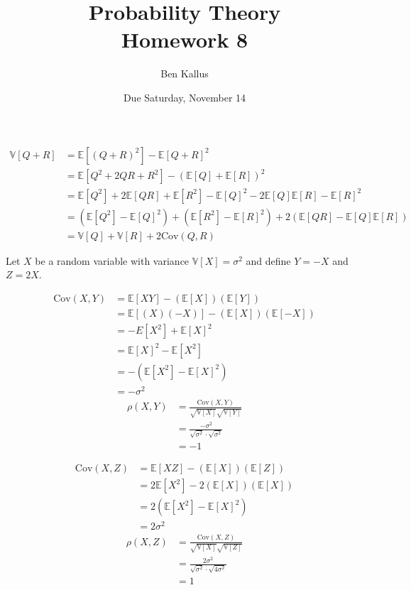 \documentclass[12pt]{article}
\title{Probability Theory \\ Homework 8}
\author{Ben Kallus}
\date{Due Saturday, November 14}
\begin{document}
\pagecolor{black}
\color{white}
\maketitle

\begin{align*}
    \mathbb V[Q + R] &= \mathbb E[(Q + R)^2] - \mathbb E[Q + R]^2 \\
                     &= \mathbb E[Q^2 + 2QR + R^2] - (\mathbb E[Q] + \mathbb E[R])^2 \\
                     &= \mathbb E[Q^2] + 2\mathbb E[QR] + \mathbb E[R^2] - \mathbb E[Q]^2 - 2\mathbb E[Q]\mathbb E[R] - \mathbb E[R]^2 \\
                     &= (\mathbb E[Q^2] - \mathbb E[Q]^2) + (\mathbb E[R^2] - \mathbb E[R]^2) + 2(\mathbb E[QR] - \mathbb E[Q]\mathbb E[R]) \\
                     &= \mathbb V[Q] + \mathbb V[R] + 2\text{Cov}(Q,R)
\end{align*}

\newpage
{} Let $X$ be a random variable with variance $\mathbb V[X] = \sigma^2$ and define $Y = -X$ and $Z = 2X$.

\medskip
{}
\begin{align*}
    \text{Cov}(X,Y) &= \mathbb E[XY] -(\mathbb E[X])(\mathbb E[Y]) \\
                    &= \mathbb E[(X)(-X)] -(\mathbb E[X])(\mathbb E[-X]) \\
                    &= \mathbb -E[X^2] +\mathbb E[X]^2 \\
                    &= \mathbb E[X]^2 - \mathbb E[X^2] \\
                    &= -(\mathbb E[X^2] - \mathbb E[X]^2) \\
                    &= -\sigma^2
\end{align*}
\begin{align*}
    \rho(X,Y) &= \frac{\text{Cov}(X,Y)}{\sqrt{\mathbb V[X]}\sqrt{\mathbb V[Y]}} \\
              &= \frac{-\sigma^2}{\sqrt{\sigma^2} \cdot \sqrt{\sigma^2}} \\
              &= -1
\end{align*}

\medskip
{}
\begin{align*}
    \text{Cov}(X,Z) &= \mathbb E[XZ] -(\mathbb E[X])(\mathbb E[Z]) \\
                    &= 2\mathbb E[X^2] - 2(\mathbb E[X])(\mathbb E[X]) \\
                    &= 2(\mathbb E[X^2] - \mathbb E[X]^2) \\
                    &= 2\sigma^2
\end{align*}
\begin{align*}
    \rho(X,Z) &= \frac{\text{Cov}(X,Z)}{\sqrt{\mathbb V[X]}\sqrt{\mathbb V[Z]}} \\
              &= \frac{2\sigma^2}{\sqrt{\sigma^2} \cdot \sqrt{4\sigma^2}} \\
              &= 1
\end{align*}
\end{document}
